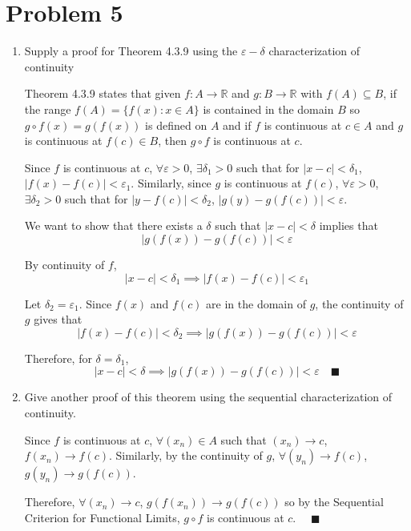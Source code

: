 \documentclass[12pt]{article}
\newcommand{\R}{\mathbb{R}}
\newcommand{\qed}{\quad \blacksquare}
\newcommand{\abs}[1]{\left\vert #1 \right\vert}
\newcommand{\ep}{\varepsilon}
\begin{document}
\section*{Problem 5}
\begin{enumerate}
	\item Supply a proof for Theorem 4.3.9 using the $\varepsilon-\delta$ characterization of continuity 
    
        \color{blue}
            Theorem 4.3.9 states that given $f: A \to \R$ and $g: B \to \R$ with $f(A) \subseteq B$, if the range $f(A) = \{f(x): x \in A\}$ is contained in the domain $B$ so $g \circ f(x) = g(f(x))$ is defined on $A$ and if $f$ is continuous at $c \in A$ and $g$ is continuous at $f(c) \in B$, then $g \circ f$ is continuous at $c$.

            Since $f$ is continuous at $c$, $\forall \ep > 0$, $\exists \delta_1 > 0$ such that for $\abs{x - c} < \delta_1$, $\abs{f(x) - f(c)} < \ep_1$. Similarly, since $g$ is continuous at $f(c)$, $\forall \ep > 0$, $\exists \delta_2 > 0$ such that for $\abs{y - f(c)} < \delta_2$, $\abs{g(y) - g(f(c))} < \ep$.

            We want to show that there exists a $\delta$ such that $\abs{x - c} < \delta$ implies that 
            \[\abs{g(f(x)) - g(f(c))} < \ep\]

            By continuity of $f$, 
            \[\abs{x - c} < \delta_1 \implies \abs{f(x) - f(c)} < \ep_1\]

            Let $\delta_2 = \ep_1$. Since $f(x)$ and $f(c)$ are in the domain of $g$, the continuity of $g$ gives that
            \[\abs{f(x) - f(c)} < \delta_2 \implies \abs{g(f(x)) - g(f(c))} < \ep\]

            Therefore, for $\delta = \delta_1$, 
            \[\abs{x - c} < \delta \implies \abs{g(f(x)) - g(f(c))} < \ep \qed\]
        \color{black}

	\item Give another proof of this theorem using the sequential characterization of continuity.
	
        \color{blue}
            Since $f$ is continuous at $c$, $\forall (x_n) \in A$ such that $(x_n) \to c$, $f(x_n) \to f(c)$. Similarly, by the continuity of $g$, $\forall (y_n) \to f(c)$, $g(y_n) \to g(f(c))$. 
            
            Therefore, $\forall (x_n) \to c$, $g(f(x_n)) \to g(f(c))$ so by the Sequential Criterion for Functional Limits, $g \circ f$ is continuous at $c$. $\qed$
        \color{black}
    \end{enumerate}
\end{document}
